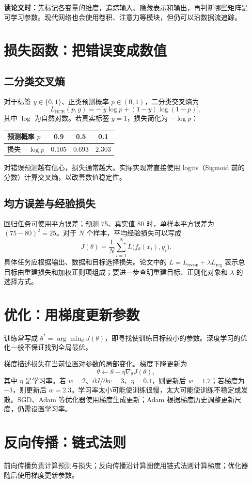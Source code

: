 \documentclass[11pt,a4paper,fontset=none]{ctexart}
\begin{document}
\textbf{读论文时：}先标记各变量的维度，追踪输入、隐藏表示和输出，再判断哪些矩阵是可学习参数。现代网络也会使用卷积、注意力等模块，但仍可以沿数据流追踪。
\section{损失函数：把错误变成数值}
\subsection{二分类交叉熵}
对于标签 $y\in\{0,1\}$、正类预测概率 $p\in(0,1)$，二分类交叉熵为
\[
L_{\mathrm{BCE}}(p,y)=-\bigl[y\log p+(1-y)\log(1-p)\bigr],
\]
其中 $\log$ 为自然对数。若真实标签 $y=1$，损失简化为 $-\log p$：
\begin{center}\begin{tabular}{lccc}\toprule
预测概率 $p$ & 0.9 & 0.5 & 0.1\\\midrule
损失 $-\log p$ & 0.105 & 0.693 & 2.303\\\bottomrule\end{tabular}\end{center}
对错误预测越有信心，损失通常越大。实际实现常直接使用 logits（Sigmoid 前的分数）计算交叉熵，以改善数值稳定性。
\subsection{均方误差与经验损失}
回归任务可使用平方误差；预测 75、真实值 80 时，单样本平方误差为 $(75-80)^2=25$。对于 $N$ 个样本，平均经验损失可以写成
\[
J(\theta)=\frac1N\sum_{i=1}^{N}L\bigl(f_\theta(x_i),y_i\bigr).
\]
具体任务应根据输出、数据和目标选择损失。论文中的 $L=L_{\mathrm{recon}}+\lambda L_{\mathrm{reg}}$ 表示总目标由重建损失和加权正则项组成；要进一步查明重建目标、正则化对象和 $\lambda$ 的选择方式。
\section{优化：用梯度更新参数}
训练常写成 $\theta^*=\arg\min_{\theta}J(\theta)$，即寻找使训练目标较小的参数。深度学习的优化一般不保证找到全局最优。

梯度描述损失在当前位置对参数的局部变化。梯度下降更新为
\[
\theta\leftarrow\theta-\eta\nabla_{\theta}J(\theta),
\]
其中 $\eta$ 是学习率。若 $w=2$、$\partial J/\partial w=3$、$\eta=0.1$，则更新后 $w=1.7$；若梯度为 $-3$，则更新后 $w=2.3$。学习率太小可能使训练很慢，太大可能使训练不稳定或发散。SGD、Adam 等优化器使用梯度生成更新；Adam 根据梯度历史调整更新尺度，仍需设置学习率。
\section{反向传播：链式法则}
前向传播负责计算预测与损失；反向传播沿计算图使用链式法则计算梯度；优化器随后使用梯度更新参数。
\end{document}
